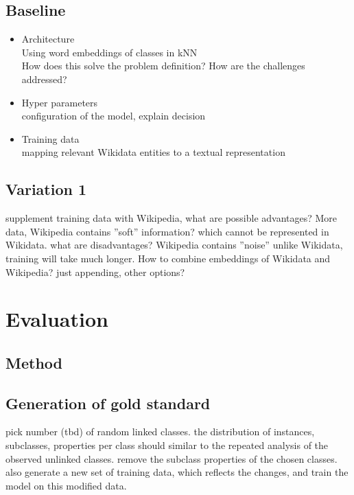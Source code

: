 \documentclass{scrartcl} %
\begin{document}
\subsection{Baseline}
\begin{itemize}
\item Architecture\\
	Using word embeddings of classes in kNN\\
	How does this solve the problem definition?
	How are the challenges addressed?
\item Hyper parameters\\
	configuration of the model, explain decision\\
	\citeauthor{Levy2015} \cite{Levy2015}
\item Training data\\
	mapping relevant Wikidata entities to a textual representation
\end{itemize}

\subsection{Variation 1}
supplement training data with Wikipedia, what are possible advantages? More data, Wikipedia contains ''soft'' 
information? which cannot be represented in Wikidata. what are disadvantages? Wikipedia contains ''noise'' unlike 
Wikidata, training will take much longer. How to combine embeddings of Wikidata and Wikipedia? just appending,
other options?

\section{Evaluation}

\subsection{Method}
\citeauthor{Dellschaft2006} \cite{Dellschaft2006}

\subsection{Generation of gold standard}
pick number (tbd) of random linked classes. the distribution of instances, subclasses, properties per class should
similar to the repeated analysis of the observed unlinked classes. remove the subclass properties of the chosen classes.
also generate a new set of training data, which reflects the changes, and train the model on this modified data.
\end{document}
